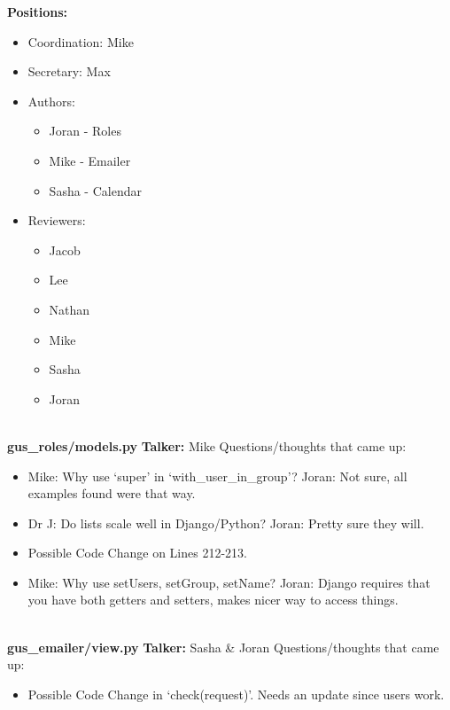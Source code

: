 \documentclass[12pt]{report}
\begin{document}
 \textbf{Positions:}
  \begin{itemize}
   \item Coordination: Mike
   \item Secretary: Max
   \item Authors:
   \begin{itemize}
    \item Joran - Roles
    \item Mike - Emailer
    \item Sasha - Calendar
   \end{itemize}
   \item Reviewers:
   \begin{itemize}
    \item Jacob
    \item Lee
    \item Nathan
    \item Mike
    \item Sasha
    \item Joran
   \end{itemize}
  \end{itemize}

 \textbf{\\[0.5pt] gus\_roles/models.py}\newline
 \textbf{Talker:} Mike\newline
 Questions/thoughts that came up:
 \begin{itemize}
  \item Mike: Why use `super' in `with\_user\_in\_group'?\newline 
           Joran: Not sure, all examples found were that way.
  \item Dr J: Do lists scale well in Django/Python?\newline
           Joran: Pretty sure they will.
  \item Possible Code Change on Lines 212-213.
  \item Mike: Why use setUsers, setGroup, setName?\newline
           Joran: Django requires that you have both getters and setters, makes nicer way to access things.
 \end{itemize}

 \textbf{\\[0.5pt] gus\_emailer/view.py}\newline
 \textbf{Talker:} Sasha \& Joran\newline
 Questions/thoughts that came up:
 \begin{itemize}
  \item Possible Code Change in `check(request)'. Needs an update since users work.
 \end{itemize}
\end{document}
